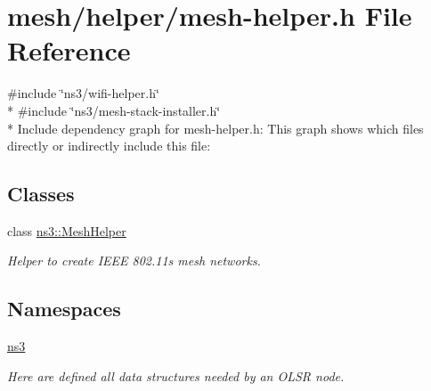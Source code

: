 \hypertarget{mesh-helper_8h}{}\section{mesh/helper/mesh-\/helper.h File Reference}
\label{mesh-helper_8h}
{\ttfamily \#include \char`\"{}ns3/wifi-\/helper.\+h\char`\"{}}\\*
{\ttfamily \#include \char`\"{}ns3/mesh-\/stack-\/installer.\+h\char`\"{}}\\*
Include dependency graph for mesh-\/helper.h\+:
This graph shows which files directly or indirectly include this file\+:
\subsection*{Classes}
\begin{DoxyCompactItemize}
\item 
class \hyperlink{classns3_1_1MeshHelper}{ns3\+::\+Mesh\+Helper}
\begin{DoxyCompactList}\small\item\em Helper to create I\+E\+EE 802.\+11s mesh networks. \end{DoxyCompactList}\end{DoxyCompactItemize}
\subsection*{Namespaces}
\begin{DoxyCompactItemize}
\item 
 \hyperlink{namespacens3}{ns3}
\begin{DoxyCompactList}\small\item\em Here are defined all data structures needed by an O\+L\+SR node. \end{DoxyCompactList}\end{DoxyCompactItemize}
